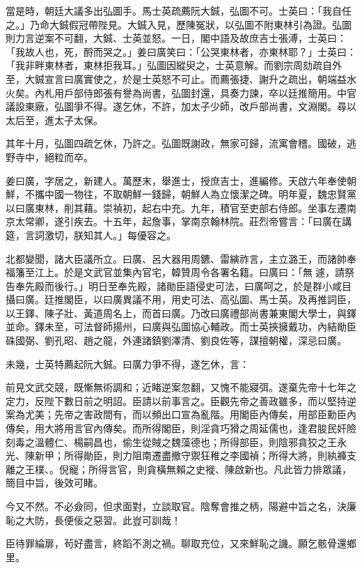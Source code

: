 \begin{pinyinscope}
當是時，朝廷大議多出弘圖手。馬士英疏薦阮大鋮，弘圖不可。士英曰：「我自任之。」乃命大鋮假冠帶陛見。大鋮入見，歷陳冤狀，以弘圖不附東林引為證。弘圖則力言逆案不可翻，大鋮、士英並怒。一日，閣中語及故庶吉士張溥，士英曰：「我故人也，死，酹而哭之。」姜曰廣笑曰：「公哭東林者，亦東林耶？」士英曰：「我非畔東林者，東林拒我耳。」弘圖因縱臾之，士英意解。而劉宗周劾疏自外至，大鋮宣言曰廣實使之，於是士英怒不可止。而薦張捷、謝升之疏出，朝端益水火矣。內札用戶部侍郎張有譽為尚書，弘圖封還，具奏力諫，卒以廷推簡用。中官議設東廠，弘圖爭不得。遂乞休，不許，加太子少師，改戶部尚書，文淵閣。尋以太后至，進太子太保。

其年十月，弘圖四疏乞休，乃許之。弘圖既謝政，無家可歸，流寓會稽。國破，逃野寺中，絕粒而卒。

姜曰廣，字居之，新建人。萬歷末，舉進士，授庶吉士，進編修。天啟六年奉使朝鮮，不攜中國一物往，不取朝鮮一錢歸，朝鮮人為立懷潔之碑。明年夏，魏忠賢黨以曰廣東林，削其藉。崇禎初，起右中充。九年，積官至吏部右侍郎。坐事左遷南京太常卿，遂引疾去。十五年，起詹事，掌南京翰林院。莊烈帝嘗言：「曰廣在講筵，言詞激切，朕知其人。」每優容之。

北都變聞，諸大臣議所立。曰廣、呂大器用周鑣、雷縯祚言，主立潞王，而諸帥奉福籓至江上。於是文武官並集內官宅，韓贊周令各署名籍。曰廣曰：「無遽，請祭告奉先殿而後行。」明日至奉先殿，諸勛臣語侵史可法，曰廣呵之，於是群小咸目攝曰廣。廷推閣臣，以曰廣異議不用，用史可法、高弘圖、馬士英。及再推詞臣，以王鐸、陳子壯、黃道周名上，而首曰廣。乃改曰廣禮部尚書兼東閣大學士，與鐸並命。鐸未至，可法督師揚州，曰廣與弘圖協心輔政。而士英挾擁戴功，內結勛臣硃國弼、劉孔昭、趙之龍，外連諸鎮劉澤清、劉良佐等，謀擅朝權，深忌曰廣。

未幾，士英特薦起阮大鋮。曰廣力爭不得，遂乞休，言：

前見文武交競，既慚無術調和；近睹逆案忽翻，又愧不能寢弭。遂棄先帝十七年之定力，反陛下數日前之明詔。臣請以前事言之。臣觀先帝之善政雖多，而以堅持逆案為尤美；先帝之害政間有，而以頻出口宣為亂階。用閣臣內傳矣，用部臣勳臣內傳矣，用大將用言官內傳矣。而所得閣臣，則淫貪巧猾之周延儒也，逢君朘民奸險刻毒之溫體仁、楊嗣昌也，偷生從賊之魏藻德也；所得部臣，則陰邪貪狡之王永光、陳新甲；所得勛臣，則力阻南遷盡撤守禦狂稚之李國禎；所得大將，則紈褲支離之王樸、。倪寵；所得言官，則貪橫無賴之史褷、陳啟新也。凡此皆力排眾議，簡目中旨，後效可睹。

今又不然。不必僉同，但求面對，立談取官。陰奪會推之柄，陽避中旨之名，決廉恥之大防，長便佞之惡習。此豈可訓哉！

臣待罪綸扉，茍好盡言，終蹈不測之禍。聊取充位，又來鮮恥之譏。願乞骸骨還鄉里。


\end{pinyinscope}
